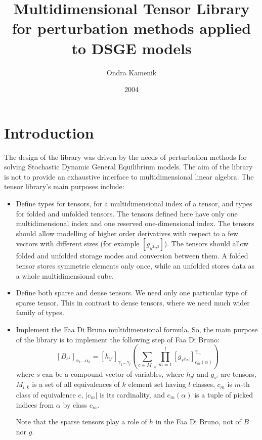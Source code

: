 \documentclass[11pt,a4paper]{article}
\begin{document}
\author{Ondra Kamenik}
\title{Multidimensional Tensor Library \\ for perturbation methods applied to DSGE
models}

\date{2004}
\maketitle

\section{Introduction}

The design of the library was driven by the needs of perturbation
methods for solving Stochastic Dynamic General Equilibrium models. The
aim of the library is not to provide an exhaustive interface to
multidimensional linear algebra. The tensor library's main purposes
include:
\begin{itemize}

\item Define types for tensors, for a multidimensional index of a
tensor, and types for folded and unfolded tensors. The tensors defined
here have only one multidimensional index and one reserved
one-dimensional index. The tensors should allow modelling of higher
order derivatives with respect to a few vectors with different sizes
(for example $\left[g_{y^2u^3}\right]$). The tensors should allow
folded and unfolded storage modes and conversion between them. A
folded tensor stores symmetric elements only once, while an unfolded
stores data as a whole multidimensional cube.

\item Define both sparse and dense tensors. We need only one particular
type of sparse tensor. This in contrast to dense tensors, where we
need much wider family of types.

\item Implement the Faa Di Bruno multidimensional formula. So, the main
purpose of the library is to implement the following step of Faa Di Bruno:
$$\left[B_{s^k}\right]_{\alpha_1\ldots\alpha_k}
=\left[h_{y^l}\right]_{\gamma_1\ldots\gamma_l}
\left(\sum_{c\in M_{l,k}}
\prod_{m=1}^l\left[g_{s^{\vert c_m\vert}}\right]^{\gamma_m}_{c_m(\alpha)}\right)$$
where $s$ can be a compound vector of variables, where $h_{y^l}$ and $g_{s^i}$
are tensors, $M_{l,k}$ is a set of
all equivalences of $k$ element set having $l$ classes, $c_m$ is
$m$-th class of equivalence $c$, $\vert c_m\vert$ is its
   cardinality, and $c_m(\alpha)$ is a tuple of
picked indices from $\alpha$ by class $c_m$.

Note that the sparse tensors play a role of $h$ in the Faa Di Bruno, not
of $B$ nor $g$.

\end{itemize}
\end{document}
